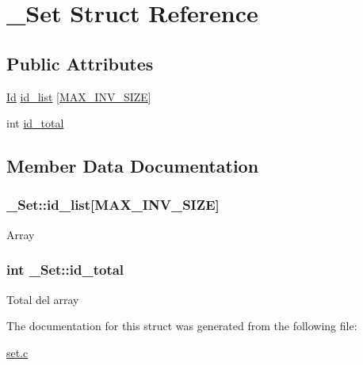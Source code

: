 \hypertarget{struct__Set}{\section{\+\_\+\+Set Struct Reference}
\label{struct__Set}
}
\subsection*{Public Attributes}
\begin{DoxyCompactItemize}
\item 
\hyperlink{types_8h_a845e604fb28f7e3d97549da3448149d3}{Id} \hyperlink{struct__Set_adde563bd36bf2d00bd5a49b493c4f3bb}{id\+\_\+list} \mbox{[}\hyperlink{set_8h_af6e65f998f2940aaf745740214a3facf}{M\+A\+X\+\_\+\+I\+N\+V\+\_\+\+S\+I\+Z\+E}\mbox{]}
\item 
int \hyperlink{struct__Set_afe941cf156f1000d962bff58835ba853}{id\+\_\+total}
\end{DoxyCompactItemize}


\subsection{Member Data Documentation}
\hypertarget{struct__Set_adde563bd36bf2d00bd5a49b493c4f3bb}{
\subsubsection[{id\+\_\+list}]{ \+\_\+\+Set\+::id\+\_\+list\mbox{[}{\bf M\+A\+X\+\_\+\+I\+N\+V\+\_\+\+S\+I\+Z\+E}\mbox{]}}}\label{struct__Set_adde563bd36bf2d00bd5a49b493c4f3bb}
Array \hypertarget{struct__Set_afe941cf156f1000d962bff58835ba853}{
\subsubsection[{id\+\_\+total}]{\setlength{\rightskip}{0pt plus 5cm}int \+\_\+\+Set\+::id\+\_\+total}}\label{struct__Set_afe941cf156f1000d962bff58835ba853}
Total del array 

The documentation for this struct was generated from the following file\+:\begin{DoxyCompactItemize}
\item 
\hyperlink{set_8c}{set.\+c}\end{DoxyCompactItemize}
